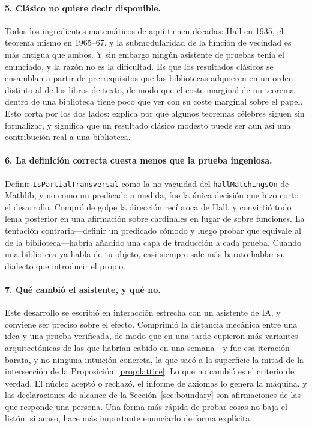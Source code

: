 \documentclass[11pt]{article}
\newcommand{\lean}[1]{\texttt{#1}}
\begin{document}
\paragraph{5. Clásico no quiere decir disponible.}
Todos los ingredientes matemáticos de aquí tienen décadas: Hall en 1935, el teorema mismo en
1965--67, y la submodularidad de la función de vecindad es más antigua que ambos. Y sin embargo
ningún asistente de pruebas tenía el enunciado, y la razón no es la dificultad. Es que los
resultados clásicos se ensamblan a partir de prerrequisitos que las bibliotecas adquieren en un
orden distinto al de los libros de texto, de modo que el coste marginal de un teorema dentro de una
biblioteca tiene poco que ver con su coste marginal sobre el papel. Esto corta por los dos lados:
explica por qué algunos teoremas célebres siguen sin formalizar, y significa que un resultado
clásico modesto puede ser aun así una contribución real a una biblioteca.

\paragraph{6. La definición correcta cuesta menos que la prueba ingeniosa.}
Definir \lean{IsPartialTransversal} como la no vacuidad del \lean{hallMatchingsOn} de Mathlib, y no
como un predicado a medida, fue la única decisión que hizo corto el desarrollo. Compró de golpe la
dirección recíproca de Hall, y convirtió todo lema posterior en una afirmación sobre cardinales en
lugar de sobre funciones. La tentación contraria---definir un predicado cómodo y luego probar que
equivale al de la biblioteca---habría añadido una capa de traducción a cada prueba. Cuando una
biblioteca ya habla de tu objeto, casi siempre sale más barato hablar su dialecto que introducir el
propio.

\paragraph{7. Qué cambió el asistente, y qué no.}
Este desarrollo se escribió en interacción estrecha con un asistente de IA, y conviene ser preciso
sobre el efecto. Comprimió la distancia mecánica entre una idea y una prueba verificada, de modo que
en una tarde cupieron más variantes arquitectónicas de las que habrían cabido en una semana---y fue
esa iteración barata, y no ninguna intuición concreta, la que sacó a la superficie la mitad de la
intersección de la Proposición~\ref{prop:lattice}. Lo que no cambió es el criterio de verdad. El
núcleo aceptó o rechazó, el informe de axiomas lo genera la máquina, y las declaraciones de alcance
de la Sección~\ref{sec:boundary} son afirmaciones de las que responde una persona. Una forma más
rápida de probar cosas no baja el listón; si acaso, hace más importante enunciarlo de forma
explícita.
\end{document}
